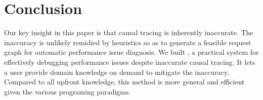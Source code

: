 \section{Conclusion} \label{sec:conclusion}

Our key insight in this paper is that causal tracing is inherently inaccurate.
The inaccuracy is unlikely remidied by heuristics so as to generate a feasible
request graph for automatic performance issue diagnosis. We built \xxx, a
practical system for effectively debugging performance issues despite inaccurate
causal tracing. It lets a user provide domain knowledge on demand to mitigate
the inaccuracy. Compared to all upfront knowledge, this method is more general
and efficient given the various programing paradigms.

\clearpage
